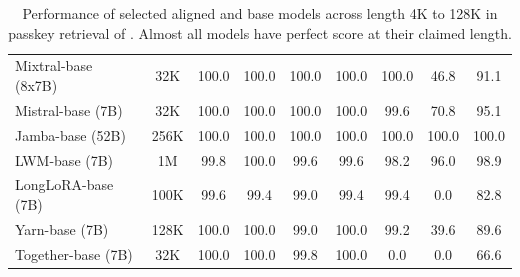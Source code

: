 \begin{table}[H]
{\begin{tabular}{@{}l|c|cccccc|c@{}}
\midrule
\midrule

Mixtral-base (8x7B) & 32K & 100.0 & 100.0 & 100.0 & 100.0 & 100.0 & 46.8 & 91.1 \\
Mistral-base (7B) & 32K & 100.0 & 100.0 & 100.0 & 100.0 & 99.6 & 70.8 & 95.1 \\
Jamba-base (52B) & 256K & 100.0 & 100.0 & 100.0 & 100.0 & 100.0 & 100.0 & 100.0 \\
LWM-base (7B) & 1M & 99.8 & 100.0 & 99.6 & 99.6 & 98.2 & 96.0 & 98.9 \\
LongLoRA-base (7B) & 100K & 99.6 & 99.4 & 99.0 & 99.4 & 99.4 & 0.0 & 82.8 \\
Yarn-base (7B) & 128K & 100.0 & 100.0 & 99.0 & 100.0 & 99.2 & 39.6 & 89.6 \\
Together-base (7B) & 32K & 100.0 & 100.0 & 99.8 & 100.0 & 0.0 & 0.0 & 66.6 \\

\bottomrule
\end{tabular}}
\caption{Performance of selected aligned and base models across length 4K to 128K in passkey retrieval of . Almost all models have perfect score at their claimed length.}
\label{tab:main_result_passkey}
\end{table}










